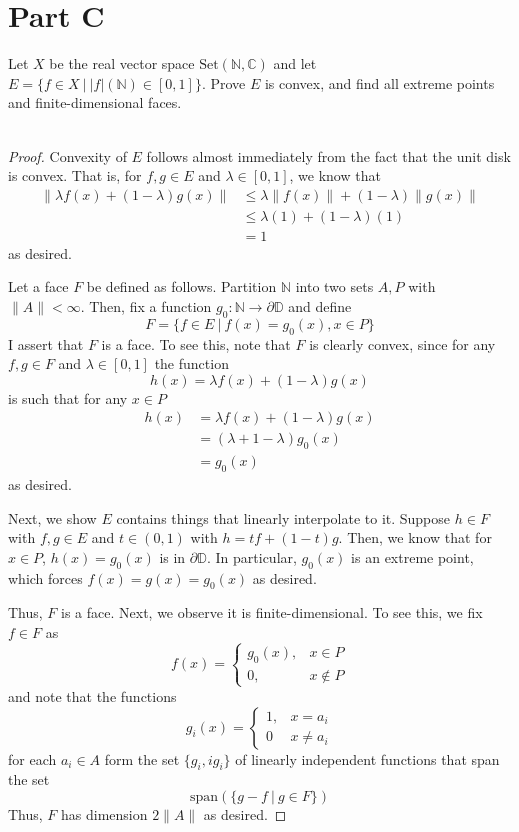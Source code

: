 \documentclass[fontsize=11pt]{scrartcl} %
\numberwithin{equation}{section} %
\numberwithin{figure}{section} %
\numberwithin{table}{section} %
\newcommand{\N}{\mathbb{N}}
\newcommand{\C}{\mathbb{C}}
\begin{document}
\section*{Part C}
Let $X$ be the real vector space $\text{Set}(\N,\C)$ and let $E=\{f\in X\ |\
|f|(\N)\in[0,1]\}$. Prove $E$ is convex, and find all extreme points and
finite-dimensional faces.
\\
\\
\begin{proof}
    Convexity of $E$ follows almost immediately from the fact that the unit disk
    is convex. That is, for $f,g\in E$ and $\lambda\in [0,1]$, we know that
    \[
\begin{aligned}
        \|\lambda f(x) + (1-\lambda)g(x)\|
        &\leq \lambda \|f(x)\| + (1-\lambda)\|g(x)\|\\
        &\leq \lambda(1) + (1-\lambda)(1)\\
        &=1
\end{aligned}
    \]
    as desired.

    Let a face $F$ be defined as follows. Partition $\N$ into two sets $A,P$
    with $\|A\|<\infty$. Then, fix a function $g_0:\N\to \partial\mathbb{D}$ and
    define
    \[
        F = \{f\in E\ |\ f(x)=g_0(x), x\in P\}
    \]
    I assert that $F$ is a face. To see this, note that $F$ is clearly convex,
    since for any $f,g\in F$ and $\lambda\in[0,1]$ the function
    \[
        h(x) = \lambda f(x) + (1-\lambda)g(x)
    \]
    is such that for any $x\in P$
    \[
        \begin{aligned}
        h(x) &= \lambda f(x) + (1-\lambda)g(x)\\
        &= (\lambda + 1-\lambda)g_0(x)\\
        &=g_0(x)
    \end{aligned}
    \]
    as desired.

    Next, we show $E$ contains things that linearly interpolate to it. Suppose
    $h\in F$ with $f,g\in E$ and $t\in (0,1)$ with $h=tf+(1-t)g$. Then, we know
    that for $x\in P$, $h(x)=g_0(x)$ is in $\partial\mathbb{D}$. In particular,
    $g_0(x)$ is an extreme point, which forces $f(x)=g(x)=g_0(x)$ as desired.

    Thus, $F$ is a face. Next, we observe it is finite-dimensional. To see this,
    we fix $f\in F$ as
    \[
        f(x) = 
        \begin{cases}
            g_0(x), &x\in P\\
            0, &x\not\in P
        \end{cases}
    \]
    and note that the functions
    \[
        g_i(x) =
        \begin{cases}
            1, &x=a_i\\
            0 &x\neq a_i
        \end{cases}
    \]
    for each $a_i\in A$ form the set $\{g_i, ig_i\}$ of linearly independent
    functions that span the set
    \[
        \text{span}(\{g-f\ |\ g\in F\})
    \]
    Thus, $F$ has dimension $2\|A\|$ as desired.


\end{proof}
\end{document}
